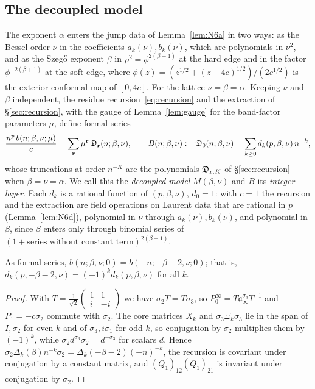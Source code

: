 \subsection{The decoupled model}\label{sec:decoupled}
The exponent $\alpha$ enters the jump data of Lemma~\ref{lem:N6a} in two ways: as the Bessel order $\nu$ in the coefficients
$a_k(\nu),b_k(\nu)$, which are polynomials in $\nu^2$, and as the Szeg\H{o} exponent $\beta$ in $\rho^2=\phi^{2(\beta+1)}$ at the hard
edge and in the factor $\phi^{-2(\beta+1)}$ at the soft edge, where $\phi(z)=(z^{1/2}+(z-4c)^{1/2})/(2c^{1/2})$ is the exterior
conformal map of $[0,4c]$. For the lattice $\nu=\beta=\alpha$. Keeping $\nu$ and $\beta$ independent, the residue
recursion~\eqref{eq:recursion} and the extraction of \S\ref{sec:recursion}, with the gauge of Lemma~\ref{lem:gauge} for the
band-factor parameters $\mu$, define formal series
\begin{equation}\label{eq:decoupled}
  \frac{n^p\,b(n;\beta,\nu;\mu)}{c}=\sum_{\mathbf r}\mu^{\mathbf r}\,\mathfrak D_{\mathbf r}(n;\beta,\nu),\qquad
  B(n;\beta,\nu):=\mathfrak D_0(n;\beta,\nu)=\sum_{k\ge0}d_k(p,\beta,\nu)\,n^{-k},
\end{equation}
whose truncations at order $n^{-K}$ are the polynomials $\mathfrak D_{\mathbf r,K}$ of \S\ref{sec:recursion} when $\beta=\nu=\alpha$. We call
this the \emph{decoupled model} $M(\beta,\nu)$ and $B$ its \emph{integer layer}. Each $d_k$ is a rational function of
$(p,\beta,\nu)$, $d_0=1$: with $c=1$ the recursion and the extraction are field operations on Laurent data that are rational
in $p$ (Lemma~\ref{lem:N6d}), polynomial in $\nu$ through $a_k(\nu),b_k(\nu)$, and polynomial in $\beta$, since $\beta$ enters
only through binomial series of $(1+\text{series without constant term})^{2(\beta+1)}$.

\begin{theorem}[reflection]\label{thm:reflect}
As formal series, $b(n;\beta,\nu;0)=b(-n;-\beta-2,\nu;0)$; that is, $d_k(p,-\beta-2,\nu)=(-1)^kd_k(p,\beta,\nu)$ for all $k$.
\end{theorem}

\begin{proof}
With $T=\frac1{\sqrt2}\left(\begin{smallmatrix}1&1\\ i&-i\end{smallmatrix}\right)$ we have $\sigma_2T=T\sigma_3$, so
$P_0^\infty=T\mathfrak a_\infty^{\sigma_3}T^{-1}$ and $P_1=-c\sigma_2$ commute with $\sigma_2$. The core matrices $X_k$ and
$\sigma_3\Xi_k\sigma_3$ lie in the span of $I,\sigma_2$ for even $k$ and of $\sigma_3,i\sigma_1$ for odd $k$, so conjugation by
$\sigma_2$ multiplies them by $(-1)^k$, while $\sigma_2d^{\sigma_3}\sigma_2=d^{-\sigma_3}$ for scalars $d$. Hence
$\sigma_2\Delta_k(\beta)n^{-k}\sigma_2=\Delta_k(-\beta-2)(-n)^{-k}$, the recursion is covariant under conjugation by a constant
matrix, and $(Q_1)_{12}(Q_1)_{21}$ is invariant under conjugation by $\sigma_2$.
\end{proof}

